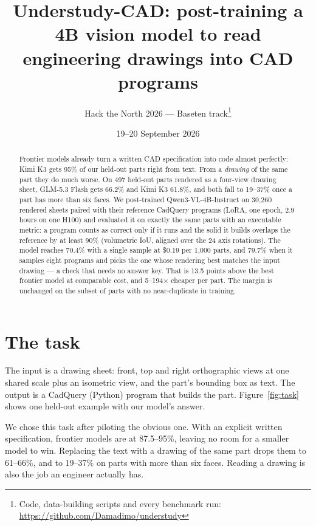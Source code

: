 \documentclass[11pt]{article}
\title{Understudy-CAD: post-training a 4B vision model to read engineering
drawings into CAD programs}
\author{Hack the North 2026 --- Baseten track\thanks{Code, data-building scripts and every benchmark run:
\url{https://github.com/Damadimo/understudy}}}
\date{19--20 September 2026}
\begin{document}
\maketitle

\begin{abstract}
Frontier models already turn a written CAD specification into code almost perfectly: Kimi K3 gets 95\% of our
held-out parts right from text. From a \emph{drawing} of the same part they do much worse. On 497 held-out parts
rendered as a four-view drawing sheet, GLM-5.3 Flash gets 66.2\% and Kimi K3 61.8\%, and both fall to 19--37\% once a
part has more than six faces. We post-trained Qwen3-VL-4B-Instruct on 30{,}260 rendered sheets paired with their
reference CadQuery programs (LoRA, one epoch, 2.9 hours on one H100) and evaluated it on exactly the same parts with
an executable metric: a program counts as correct only if it runs and the solid it builds overlaps the reference by
at least 90\% (volumetric IoU, aligned over the 24 axis rotations). The model reaches 70.4\% with a single sample at
\$0.19 per 1{,}000 parts, and 79.7\% when it samples eight programs and picks the one whose rendering best matches
the input drawing --- a check that needs no answer key. That is 13.5 points above the best frontier model at
comparable cost, and 5--194$\times$ cheaper per part. The margin is unchanged on the subset of parts with no
near-duplicate in training.
\end{abstract}

\section{The task}

The input is a drawing sheet: front, top and right orthographic views at one shared scale plus an isometric view, and
the part's bounding box as text. The output is a CadQuery (Python) program that builds the part. Figure~\ref{fig:task}
shows one held-out example with our model's answer.

We chose this task after piloting the obvious one. With an explicit written specification, frontier models are at
87.5--95\%, leaving no room for a smaller model to win. Replacing the text with a drawing of the same part drops them
to 61--66\%, and to 19--37\% on parts with more than six faces. Reading a drawing is also the job an engineer
actually has.
\end{document}
